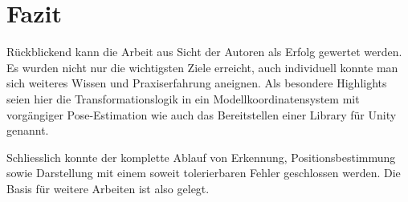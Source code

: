 \chapter{Fazit}
Rückblickend kann die Arbeit aus Sicht der Autoren als Erfolg gewertet werden. Es wurden nicht nur die wichtigsten Ziele
erreicht, auch individuell konnte man sich weiteres Wissen und Praxiserfahrung aneignen. Als besondere Highlights seien
hier die Transformationslogik in ein Modellkoordinatensystem mit vorgängiger Pose-Estimation wie auch das Bereitstellen
einer Library für Unity genannt.

Schliesslich konnte der komplette Ablauf von Erkennung, Positionsbestimmung sowie Darstellung mit einem soweit tolerierbaren
Fehler geschlossen werden. Die Basis für weitere Arbeiten ist also gelegt.
